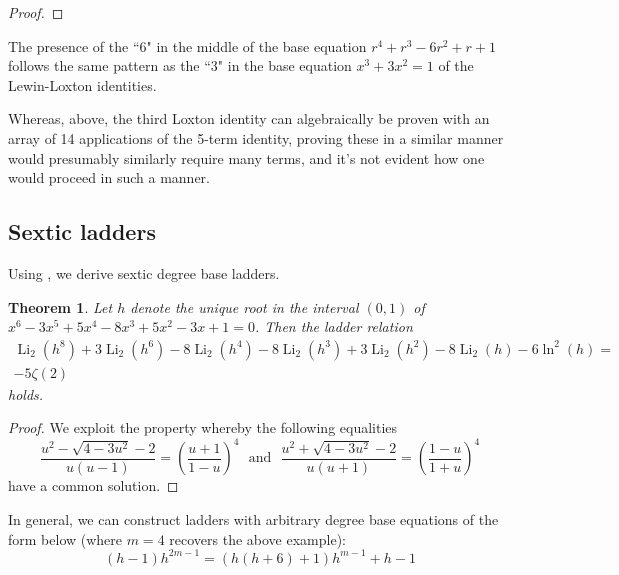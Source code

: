 \documentclass[12pt]{article}
\newtheorem{theorem}{Theorem}
\begin{document}
{\begin{proof}
\end{proof}

\remark The presence of the ``6" in the middle of the base equation $r^4 + r^3 - 6 r^2 + r + 1$ follows the same pattern as the ``3" in the base equation $ x^3 + 3x
^2 = 1$ of the Lewin-Loxton identities. 

\remark  Whereas, above, the third Loxton identity can algebraically be proven with an array of 14 applications of the 5-term identity, proving these in a similar manner would presumably similarly require many terms, and it's not evident how one would proceed in such a manner. 



\subsection{Sextic ladders}
 
Using  , we derive sextic degree base ladders.

\begin{theorem}\label{theoremnew6term}
 Let $h$ denote the unique root in the interval $(0, 1)$ of $x^6-3 x^5+5 x^4-8 x^3+5 x^2-3 x+1 = 0$. Then the ladder relation 
\begin{multline*}
 \operatorname{Li}_2\left(h^8\right) + 3 \operatorname{Li}_2\left(h^6\right) - 
 8 \operatorname{Li}_2\left(h^4\right) - 8 \operatorname{Li}_2\left(h^3\right) + 
 3 \operatorname{Li}_2\left(h^2\right) - 8 \operatorname{Li}_2(h)-6 \ln ^2(h) = \\ 
 -5 \zeta(2) 
\end{multline*}
 holds. 
\end{theorem}

\begin{proof}
 We exploit the property whereby the following equalities 
\begin{equation*}\label{commonsolutionfor6}
 \frac{u^2 - \sqrt{4 - 3u^2} - 2}{u(u - 1)} = \left( \frac{u + 1}{1 - u} \right)^4 
 \ \ \ \text{and} \ \ \ 
 \frac{u^2 + \sqrt{4 - 3u^2} - 2}{u(u + 1)} = \left( \frac{1 - u}{1 + u} \right)^4 
\end{equation*}
 have a common solution.  
\end{proof}

\noindent In general, we can construct ladders with arbitrary degree base equations of the form below (where $m=4$ recovers the above example):  \begin{equation*}
(h - 1) h^{2 m-1} = (h (h + 6) + 1) h^{m-1} +h - 1 
\end{equation*} 

}
\end{document}

